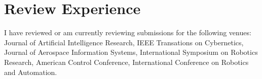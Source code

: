 \documentclass[10pt,roman]{moderncv}
\begin{document}
\section{Review Experience}

I have reviewed or am currently reviewing submissions for the following venues: Journal of Artificial Intelligence Research, IEEE Transations on Cybernetics, Journal of Aerospace Information Systems, International Symposium on Robotics Research, American Control Conference, International Conference on Robotics and Automation.

% 
\printbibliography[title={Publications}, resetnumbers=true]
\end{document}
